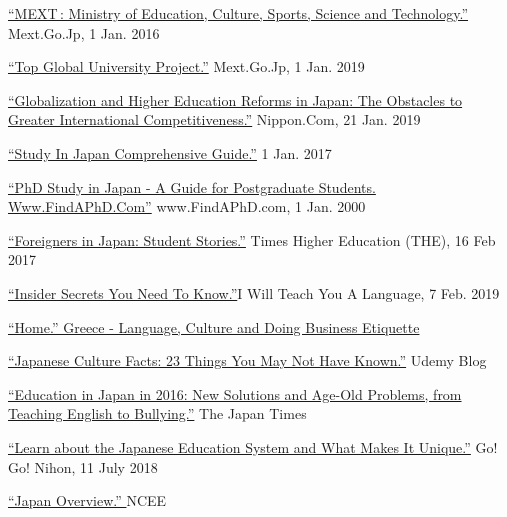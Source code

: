 \documentclass{article}
\begin{document}
\begin{thebibliography}{9}
\href{http://www.mext.go.jp/en/index.html.}{“MEXT : Ministry of Education, Culture, Sports, Science and Technology.”} Mext.Go.Jp, 1 Jan. 2016

  
\href{https://tgu.mext.go.jp/en/index.html.}{“Top Global University Project.”} Mext.Go.Jp, 1 Jan. 2019

 
\href{https://www.nippon.com/en/in-depth/a02801/}{“Globalization and Higher Education Reforms in Japan: The Obstacles to Greater International Competitiveness.”} Nippon.Com, 21 Jan. 2019


\href{https://www.studyjapan.go.jp/en/.}{“Study In Japan Comprehensive Guide.”} 1 Jan. 2017


\href{https://www.findaphd.com/study-abroad/asia/phd-study-in-japan.aspx.}{“PhD Study in Japan - A Guide for Postgraduate Students. Www.FindAPhD.Com”} www.FindAPhD.com, 1 Jan. 2000

\href{https://www.findaphd.com/study-abroad/asia/phd-study-in-japan.aspx.}{“Foreigners in Japan: Student Stories.”} Times Higher Education (THE), 16 Feb 2017


\href{www.iwillteachyoualanguage.com/learn/japanese/japanese-tips/japanese-culture-for-foreigners.}{“Insider Secrets You Need To Know.”}I Will Teach You A Language, 7 Feb. 2019


\href{www.commisceo-global.com/resources/country-guides/japan-guide.}{“Home.” Greece - Language, Culture and Doing Business Etiquette}


\href{blog.udemy.com/japanese-culture-facts/.}{“Japanese Culture Facts: 23 Things You May Not Have Known.”} Udemy Blog

  
\href{www.japantimes.co.jp/community/2017/01/25/issues/education-japan-2016-new-solutions-age-old-problems-teaching-english-bullying/#.XGbF2TNKhPY.}{“Education in Japan in 2016: New Solutions and Age-Old Problems, from Teaching English to Bullying.”} The Japan Times


\href{gogonihon.com/en/blog/learn-about-the-japanese-education-system/}{“Learn about the Japanese Education System and What Makes It Unique.”} Go! Go! Nihon, 11 July 2018


\href{ncee.org/what-we-do/center-on-international-education-benchmarking/top-performing-countries/japan-overview/.}{“Japan Overview.” } NCEE 



\end{thebibliography}
\end{document}
